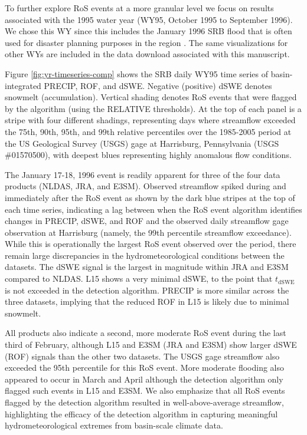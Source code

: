 \documentclass[nhess, manuscript]{copernicus}
\begin{document}
To further explore RoS events at a more granular level we focus on results associated with the 1995 water year (WY95, October 1995 to September 1996).
We chose this WY since this includes the January 1996 SRB flood that is often used for disaster planning purposes in the region \citep{army2001non}.
The same visualizations for other WYs are included in the data download associated with this manuscript.

Figure \ref{fig:yr-timeseries-comp} shows the SRB daily WY95 time series of basin-integrated PRECIP, ROF, and dSWE.
Negative (positive) dSWE denotes snowmelt (accumulation).
Vertical shading denotes RoS events that were flagged by the algorithm (using the RELATIVE thresholds).
At the top of each panel is a stripe with four different shadings, representing days where streamflow exceeded the 75th, 90th, 95th, and 99th relative percentiles over the 1985-2005 period at the US Geological Survey (USGS) gage at Harrisburg, Pennsylvania (USGS \#01570500), with deepest blues representing highly anomalous flow conditions.

The January 17-18, 1996 event is readily apparent for three of the four data products (NLDAS, JRA, and E3SM).
Observed streamflow spiked during and immediately after the RoS event as shown by the dark blue stripes at the top of each time series, indicating a lag between when the RoS event algorithm identifies changes in PRECIP, dSWE, and ROF and the observed daily streamflow gage observation at Harrisburg (namely, the 99th percentile streamflow exceedance).
While this is operationally the largest RoS event observed over the period, there remain large discrepancies in the hydrometeorological conditions between the datasets.
The dSWE signal is the largest in magnitude within JRA and E3SM compared to NLDAS.
L15 shows a very minimal dSWE, to the point that $t_\textrm{dSWE}$ is not exceeded in the detection algorithm.
PRECIP is more similar across the three datasets, implying that the reduced ROF in L15 is likely due to minimal snowmelt.

All products also indicate a second, more moderate RoS event during the last third of February, although L15 and E3SM (JRA and E3SM) show larger dSWE (ROF) signals than the other two datasets.
The USGS gage streamflow also exceeded the 95th percentile for this RoS event.
More moderate flooding also appeared to occur in March and April although the detection algorithm only flagged such events in L15 and E3SM.
We also emphasize that all RoS events flagged by the detection algorithm resulted in well-above-average streamflow, highlighting the efficacy of the detection algorithm in capturing meaningful hydrometeorological extremes from basin-scale climate data.
\end{document}
